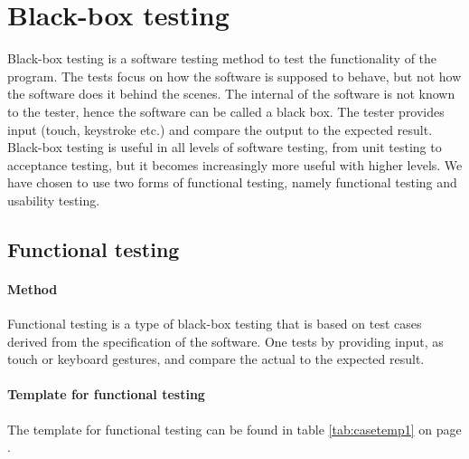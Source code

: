 
\section{Black-box testing}
Black-box testing \cite{bib:blackbox} \cite{bib:bbfun} is a software testing method to test the functionality of the program. The tests focus on how the software is supposed to behave, but not how the software does it behind the scenes. The internal of the software is not known to the tester, hence the software can be called a black box. The tester provides input (touch, keystroke etc.) and compare the output to the expected result. Black-box testing is useful in all levels of software testing, from unit testing to acceptance testing, but it becomes increasingly more useful with higher levels. 
\newline
\newline
We have chosen to use two forms of functional testing, namely functional testing and usability testing. 

\subsection{Functional testing}\label{subsec:functionaltesting}

\paragraph{Method}\hfill
\newline
Functional testing \cite{bib:funtest} is a type of black-box testing that is based on test cases derived from the specification of the software. One tests by providing input, as touch or keyboard gestures, and compare the actual to the expected result. 

\paragraph{Template for functional testing}\hfill
\newline		
The template for functional testing can be found in table \ref{tab:casetemp1} on page \pageref{tab:casetemp1}.	

